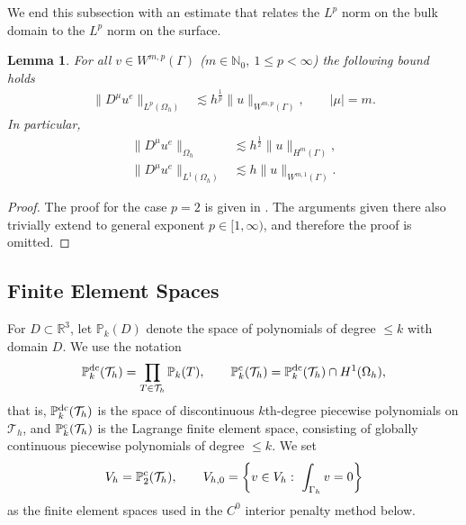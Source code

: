 \documentclass[10pt, a4paper]{amsart}
\newcommand{\bbR}{\mathbb{R}}
\newcommand{\calT}{\mathcal{T}}
\newtheorem{lemma}[theorem]{Lemma}
\theoremstyle{definition}
\theoremstyle{remark}
\theoremstyle{example}
\numberwithin{equation}{section}
\begin{document}
We end this subsection with 
an estimate that relates the $L^p$ norm
 on the bulk domain
to the $L^p$ norm on the surface.
\begin{lemma} \label{lem:deltaLem}
For all $v \in W^{m, p}(\Gamma)$ ($m\in \mathbb{N}_0,\ 1 \leq p < \infty$) the following bound holds
\begin{align*}
\|D^\mu u^e\|_{L^p(\Omega_h)}
& \lesssim h^{\frac{1}{p}}\|u\|_{W^{m, p}(\Gamma)}, \qquad |\mu| = m.
\end{align*}
In particular,
\begin{align}
\|D^\mu u^e\|_{\Omega_h}
& \lesssim h^{\frac{1}{2}}\|u\|_{H^m(\Gamma)}, \label{*} \\
\|D^\mu u^e\|_{L^1(\Omega_h)}
& \lesssim h\|u\|_{W^{m, 1}(\Gamma)}. \label{250728-1}
\end{align}
\end{lemma}

\begin{proof}
The proof for the case $p=2$ is given 
in \cite[Lemma 3.1]{reusken2015analysis}.
The arguments given there also trivially
extend to general exponent $p\in [1,\infty)$,
and therefore the proof is omitted.
\end{proof}

 

\subsection{Finite Element Spaces}
For $D\subset \bbR^3$, let $\mathbb{P}_k(D)$ denote
the space of polynomials of degree $\le k$ with domain $D$.
We use the notation
\[
\mathbb{P}_k^{{\rm dc}}(\calT_h) = \prod_{T\in \calT_h} \mathbb{P}_k(T),\qquad
\mathbb{P}_k^{{\rm c}}(\calT_h) = \mathbb{P}_k^{{\rm dc}}(\calT_h)\cap H^1(\Omega_h),
\]
that is, $\mathbb{P}_k^{{\rm dc}}(\calT_h)$ is the space
of discontinuous $k$th-degree piecewise polynomials on $\calT_h$,
and $\mathbb{P}_k^{{\rm c}}(\calT_h)$ is the Lagrange finite element space,
consisting of globally continuous piecewise polynomials of degree $\le k$.
We set
\[
V_h = \mathbb{P}_2^{{\rm c}}(\calT_h),\qquad V_{h,0} = \left\{v\in V_h:\ \int_{\Gamma_h} v=0\right\}
\]
as the finite element spaces used in the $C^0$ interior penalty method below.



\end{document}
